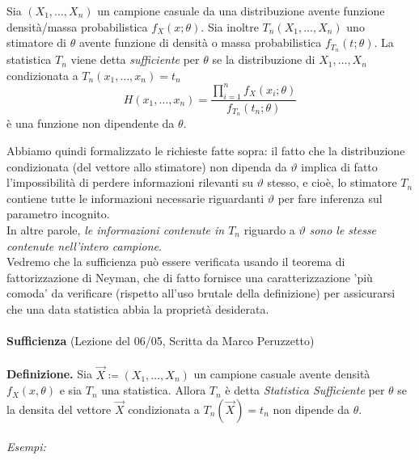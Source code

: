 \begin{dfn}[Sufficienza]
  Sia \((X_1,\dotsc,X_n)\) un campione casuale da una distribuzione avente funzione densità/massa probabilistica \(f_X(x;\theta)\). Sia inoltre \(T_n(X_1,\dotsc,X_n)\) uno stimatore di \(\theta\) avente funzione di densità o massa probabilistica \(f_{T_n}(t; \theta)\).
  La statistica \(T_n\) viene detta \emph{sufficiente} per \(\theta\) se la distribuzione di \(X_1,\dotsc,X_n\) condizionata a \(T_n(x_1,\dotsc,x_n) = t_n\)
  \begin{equation*}
    H(x_1,\dotsc,x_n) = \frac{\prod_{i=1}^n f_{X}(x_i;\theta)}{f_{T_n}(t_n;\theta)}
  \end{equation*}
  è una funzione non dipendente da \(\theta\).
\end{dfn}


Abbiamo quindi formalizzato le richieste fatte sopra: il fatto che la distribuzione condizionata (del vettore allo stimatore) non dipenda da $\vartheta$ implica di fatto l'impossibilità di perdere informazioni rilevanti su $\vartheta$ stesso, e cioè, lo stimatore $T_n$ contiene tutte le informazioni necessarie riguardanti $\vartheta$ per fare inferenza sul parametro incognito.\\
In altre parole, \textit{le informazioni contenute in $T_n$} riguardo a $\vartheta$ \textit{sono le stesse contenute nell'intero campione}.\\
Vedremo che la sufficienza può essere verificata usando il teorema di fattorizzazione di Neyman, che di fatto fornisce una caratterizzazione 'più comoda' da verificare (rispetto all'uso brutale della definizione) per assicurarsi che una data statistica abbia la proprietà desiderata.\\
\\
\noindent\textbf{Sufficienza} (Lezione del 06/05, Scritta da Marco Peruzzetto)\\
\\
\textbf{Definizione.} Sia $\vec{X}\coloneqq (X_1,\ldots,X_n)$ un campione casuale avente densità $f_X(x,\theta)$ e sia $T_n$ una statistica. Allora $T_n$ è detta \textit{Statistica Sufficiente} per $\theta$ se la densita del vettore $\vec{X}$ condizionata a $T_n(\vec{X})=t_n$ non dipende da $\theta.$
\\
\\
\textit{Esempi:} 


